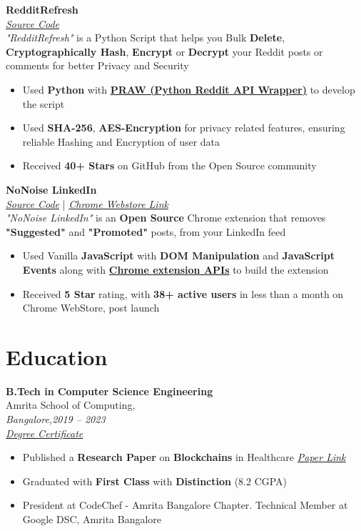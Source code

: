 \documentclass[a4paper,8pt]{article}
\newcommand{\praw}{\href{https://github.com/praw-dev/praw}{PRAW (Python Reddit API Wrapper)}}
\begin{document}
\textbf{RedditRefresh} \\ \textit{\href{https://github.com/karan51ngh/RedditRefresh}{Source Code}} \\
\textit{"RedditRefresh"} is a Python Script that helps you Bulk \textbf{Delete}, \textbf{Cryptographically Hash}, \textbf{Encrypt} or \textbf{Decrypt} your Reddit posts or comments for better Privacy and Security
\begin{itemize}[leftmargin=1.5em]
    \item Used \textbf{Python} with \textbf{\praw} to develop the script
    \item Used \textbf{SHA-256}, \textbf{AES-Encryption} for privacy related features, ensuring reliable Hashing and Encryption of user data
    \item Received \textbf{40+ Stars} on GitHub from the Open Source community
\end{itemize}
\textbf{NoNoise LinkedIn} \\ \textit{\href{https://github.com/karan51ngh/no-noise-linkedin}{Source Code}} | \textit{\href{https://github.com/karan51ngh/no-noise-linkedin}{Chrome Webstore Link}} \\
\textit{"NoNoise LinkedIn"} is an \textbf{Open Source} Chrome extension that removes \textbf{"Suggested"} and \textbf{"Promoted"} posts, from your LinkedIn feed

\begin{itemize}[leftmargin=1.5em]
    \item Used Vanilla \textbf{JavaScript} with \textbf{DOM Manipulation} and \textbf{JavaScript Events} along with \textbf{\href{https://developer.chrome.com/docs/extensions/reference/api}{Chrome extension APIs}} to build the extension
    \item Received \textbf{5 Star} rating, with \textbf{38+ active users} in less than a month on Chrome WebStore, post launch
\end{itemize}

\section*{\faGraduationCap\hspace{0.5em}Education}

\textbf{B.Tech in Computer Science Engineering} \\
{Amrita School of Computing},  \\ \textit{Bangalore,2019 -- 2023} \\
\textit{\href{https://drive.google.com/drive/folders/1Hu5mrXyz4nnYDJhT7x9IuLwLyBzCwkKB}{Degree Certificate}}
\begin{itemize}[leftmargin=1.5em]
    \item Published a \textbf{Research Paper} on \textbf{Blockchains} in Healthcare \textit{\href{https://papers.ssrn.com/sol3/papers.cfm?abstract_id=4804243}{Paper Link}}
    \item Graduated with \textbf{First Class} with \textbf{Distinction} (8.2 CGPA)
    \item President at CodeChef - Amrita Bangalore Chapter. Technical Member at Google DSC, Amrita Bangalore
\end{itemize}
\end{document}
